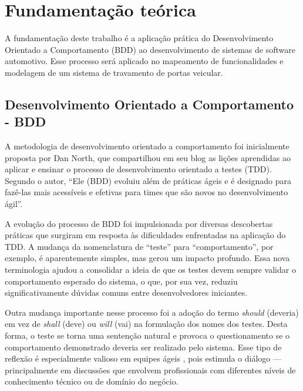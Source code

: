 \chapter{Fundamentação teórica}

A fundamentação deste trabalho é a aplicação prática do Desenvolvimento Orientado a Comportamento (BDD) ao desenvolvimento de sistemas de software automotivo. 
Esse processo será aplicado no mapeamento de funcionalidades e modelagem de um sistema de travamento de portas veicular.

\section{\textbf{Desenvolvimento Orientado a Comportamento - BDD}}

A metodologia de desenvolvimento orientado a comportamento foi inicialmente proposta por Dan North, que compartilhou em seu blog \cite{north2006bdd} as lições 
aprendidas ao aplicar e ensinar o processo de desenvolvimento orientado a testes (TDD). Segundo o autor, “Ele (BDD) evoluiu além de práticas ágeis e é designado 
para fazê-las mais acessíveis e efetivas para times que são novos no desenvolvimento ágil”.

A evolução do processo de BDD foi impulsionada por diversas descobertas práticas que surgiram em resposta às dificuldades enfrentadas na aplicação do TDD. A mudança 
da nomenclatura de “teste” para “comportamento”, por exemplo, é aparentemente simples, mas gerou um impacto profundo. Essa nova terminologia ajudou a consolidar a 
ideia de que os testes devem sempre validar o comportamento esperado do sistema, o que, por sua vez, reduziu significativamente dúvidas comuns entre desenvolvedores 
iniciantes.

Outra mudança importante nesse processo foi a adoção do termo \textit{should} (deveria) em vez de \textit{shall} (deve) ou \textit{will} (vai) na formulação dos nomes 
dos testes. Desta forma, o teste se torna uma sentenção natural e provoca o questionamento se o comportamento demonstrado deveria ser realizado pelo sistema.  
Esse tipo de reflexão é especialmente valioso em equipes ágeis \cite{atlassianAgileTeams}, pois estimula o diálogo — principalmente em discussões que envolvem 
profissionais com diferentes níveis de conhecimento técnico ou de domínio do negócio.

